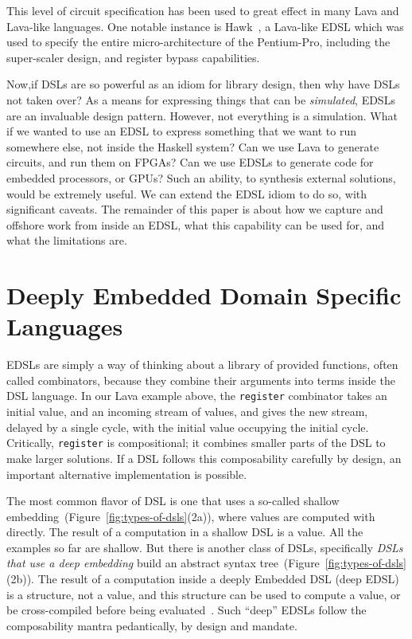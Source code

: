 \documentclass[11pt]{article}
\begin{document}
This level of circuit specification has been used to great
effect in many Lava and Lava-like languages. One notable
instance is Hawk~\cite{Matthews:1998:Hawk}, a Lava-like EDSL which was used to specify
the entire micro-architecture of the Pentium-Pro, including the
super-scaler design, and register bypass capabilities.

Now,if DSLs are so powerful as an idiom for library design, then why have DSLs not taken over?
As a means for expressing things that can be {\em simulated\/}, EDSLs are an invaluable
design pattern. 
However, not everything is a simulation. What if we wanted to use an EDSL to express
something that we want to run somewhere else, not inside the Haskell system?
Can we use Lava to generate circuits, and run them on FPGAs? Can we use EDSLs
to generate code for embedded processors, or GPUs? Such an ability, to 
synthesis external solutions, would be extremely useful. We can extend
the EDSL idiom to do so, with significant caveats. The remainder of this
paper is about how we capture and offshore work from inside an EDSL, what
this capability can be used for, and what the limitations are.

\section{Deeply Embedded Domain Specific Languages}

EDSLs are simply a way of thinking about a library
of provided functions, often called combinators, because they combine
their arguments into terms inside the DSL language. In our
Lava example above, the \verb|register| combinator takes an initial
value, and an incoming stream of values, and gives the new stream,
delayed by a single cycle, with the initial value occupying the initial
cycle. Critically, \verb|register| is compositional; it combines
smaller parts of the DSL to make larger solutions. If a DSL
follows this composability carefully by design, an important alternative implementation
is possible.

The most common flavor of DSL is one  that uses a so-called shallow embedding~(Figure~\ref{fig:types-of-dsls}(2a)), where values are computed with directly.
The result of a computation in a shallow DSL is a value. All the examples so far are shallow.
But there is another class of DSLs, 
specifically {\em DSLs that use a deep embedding\/} build an abstract syntax tree~(Figure~\ref{fig:types-of-dsls}(2b)).
The result of a computation inside a deeply Embedded DSL (deep EDSL)
is a structure, not a value, and this structure can be used to compute a value,
or be cross-compiled before being evaluated~\cite{Elliott:03:CompileDSEL-JFP}. Such ``deep'' EDSLs
follow the composability mantra pedantically, by design and mandate.
\end{document}
